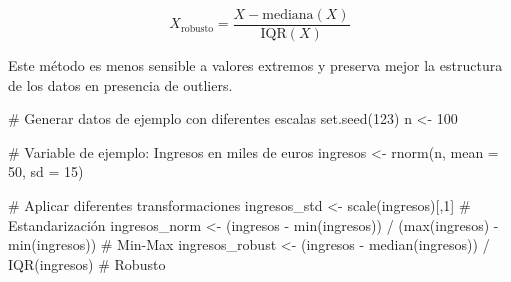 \documentclass[
  letterpaper,
  DIV=11,
  numbers=noendperiod]{scrreprt}
\newenvironment{Shaded}{\begin{snugshade}}{\end{snugshade}}
\newcommand{\AttributeTok}[1]{\textcolor[rgb]{0.40,0.45,0.13}{#1}}
\newcommand{\CommentTok}[1]{\textcolor[rgb]{0.37,0.37,0.37}{#1}}
\newcommand{\DecValTok}[1]{\textcolor[rgb]{0.68,0.00,0.00}{#1}}
\newcommand{\FunctionTok}[1]{\textcolor[rgb]{0.28,0.35,0.67}{#1}}
\newcommand{\NormalTok}[1]{\textcolor[rgb]{0.00,0.23,0.31}{#1}}
\newcommand{\OtherTok}[1]{\textcolor[rgb]{0.00,0.23,0.31}{#1}}
\newcommand{\SpecialCharTok}[1]{\textcolor[rgb]{0.37,0.37,0.37}{#1}}
\begin{document}
\[X_{\text{robusto}} = \frac{X - \text{mediana}(X)}{\text{IQR}(X)}\]

Este método es menos sensible a valores extremos y preserva mejor la
estructura de los datos en presencia de outliers.

\begin{tcolorbox}[enhanced jigsaw, breakable, toprule=.15mm, bottomtitle=1mm, coltitle=black, colbacktitle=quarto-callout-tip-color!10!white, titlerule=0mm, opacitybacktitle=0.6, bottomrule=.15mm, toptitle=1mm, title=\textcolor{quarto-callout-tip-color}{\faLightbulb}\hspace{0.5em}{Ejemplo comparativo: Escalado de variables}, arc=.35mm, rightrule=.15mm, opacityback=0, colframe=quarto-callout-tip-color-frame, leftrule=.75mm, left=2mm, colback=white]

\begin{Shaded}
\begin{Highlighting}[]
\CommentTok{\# Generar datos de ejemplo con diferentes escalas}
\FunctionTok{set.seed}\NormalTok{(}\DecValTok{123}\NormalTok{)}
\NormalTok{n }\OtherTok{\textless{}{-}} \DecValTok{100}

\CommentTok{\# Variable de ejemplo: Ingresos en miles de euros}
\NormalTok{ingresos }\OtherTok{\textless{}{-}} \FunctionTok{rnorm}\NormalTok{(n, }\AttributeTok{mean =} \DecValTok{50}\NormalTok{, }\AttributeTok{sd =} \DecValTok{15}\NormalTok{)}

\CommentTok{\# Aplicar diferentes transformaciones}
\NormalTok{ingresos\_std }\OtherTok{\textless{}{-}} \FunctionTok{scale}\NormalTok{(ingresos)[,}\DecValTok{1}\NormalTok{]  }\CommentTok{\# Estandarización}
\NormalTok{ingresos\_norm }\OtherTok{\textless{}{-}}\NormalTok{ (ingresos }\SpecialCharTok{{-}} \FunctionTok{min}\NormalTok{(ingresos)) }\SpecialCharTok{/}\NormalTok{ (}\FunctionTok{max}\NormalTok{(ingresos) }\SpecialCharTok{{-}} \FunctionTok{min}\NormalTok{(ingresos))  }\CommentTok{\# Min{-}Max}
\NormalTok{ingresos\_robust }\OtherTok{\textless{}{-}}\NormalTok{ (ingresos }\SpecialCharTok{{-}} \FunctionTok{median}\NormalTok{(ingresos)) }\SpecialCharTok{/} \FunctionTok{IQR}\NormalTok{(ingresos)  }\CommentTok{\# Robusto}


\end{Highlighting}
\end{Shaded}
\end{tcolorbox}
\end{document}
